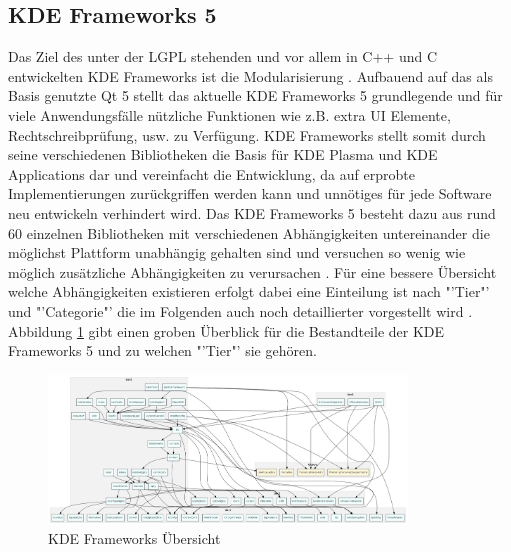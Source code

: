 \subsection{KDE Frameworks 5}
Das Ziel des unter der LGPL stehenden und vor allem in C++ und C entwickelten KDE Frameworks ist die Modularisierung \cite{KDEDeveloperPlatform}. Aufbauend auf das als Basis genutzte Qt 5 stellt das aktuelle KDE Frameworks 5 grundlegende und für viele Anwendungsfälle nützliche Funktionen wie z.B. extra UI Elemente, Rechtschreibprüfung, usw. zu Verfügung. KDE Frameworks stellt somit durch seine verschiedenen Bibliotheken die Basis für KDE Plasma und KDE Applications dar und vereinfacht die Entwicklung, da auf erprobte Implementierungen zurückgriffen werden kann und unnötiges für jede Software neu entwickeln verhindert wird. Das KDE Frameworks 5 besteht dazu aus rund 60 einzelnen Bibliotheken mit verschiedenen Abhängigkeiten untereinander die möglichst Plattform unabhängig gehalten sind und versuchen so wenig wie möglich zusätzliche Abhängigkeiten zu verursachen \cite{KDEFramework5TechPreview}. Für eine bessere Übersicht welche Abhängigkeiten existieren erfolgt dabei eine Einteilung ist nach "'Tier"' und "'Categorie"' die im Folgenden auch noch detaillierter vorgestellt wird \cite{KDEFramework5}. Abbildung \ref{fig:kde_frameworks} gibt einen groben Überblick für die Bestandteile der KDE Frameworks 5 und zu welchen "'Tier"' sie gehören.

\begin{figure}[tb]
	\centering
	\includegraphics[width=0.85\textwidth]{images/kf5_big_0.png}
	\caption{KDE Frameworks Übersicht \cite{KDEFramework5TechPreview}}
	\label{fig:kde_frameworks}
\end{figure}

